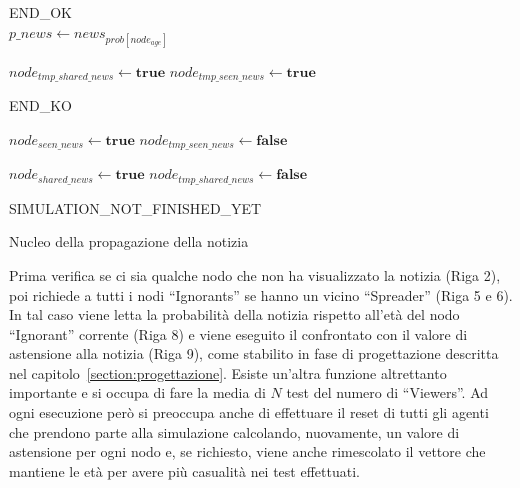 \begin{algorithm}
 \begin{algorithmic}[1]
	\State \Return END\_OK
      \Else 
	  \\
	    \State $p\_news \gets news_{prob[node_{age}]}$
	    
	      \State $node_{tmp\_shared\_news} \gets \textbf{true}$
	    \EndIf
	    \State $node_{tmp\_seen\_news} \gets \textbf{true}$
	    
	  \EndIf
	\EndFor
	  \State \Return END\_KO
	\EndIf
	
	  \State $node_{seen\_news} \gets \textbf{true}$
	  \State $node_{tmp\_seen\_news} \gets \textbf{false}$
	\EndFor
	
	  \State $node_{shared\_news} \gets \textbf{true}$
	  \State $node_{tmp\_shared\_news} \gets \textbf{false}$
	\EndFor
      
	\State \Return SIMULATION\_NOT\_FINISHED\_YET
      \EndIf
    \EndProcedure
 \end{algorithmic}
 
 \caption{Nucleo della propagazione della notizia}
 \label{alg:core_spread}
\end{algorithm}

Prima verifica se ci sia qualche nodo che non ha visualizzato la notizia (Riga 2), 
poi richiede a tutti i nodi ``Ignorants'' se hanno un vicino ``Spreader'' (Riga 5 e 6). 
In tal caso viene letta la probabilità della notizia rispetto all'età del nodo ``Ignorant'' corrente (Riga 8) e viene eseguito il 
confrontato con il valore di astensione alla notizia (Riga 9), come stabilito in fase di progettazione descritta nel capitolo~\ref{section:progettazione}. 
Esiste un'altra funzione altrettanto importante e si occupa di fare la media di $N$ test del numero di ``Viewers''.
Ad ogni esecuzione però si preoccupa anche di effettuare il reset di tutti gli agenti che prendono parte alla simulazione 
calcolando, nuovamente, un valore di astensione per ogni nodo e, se richiesto, viene anche rimescolato il 
vettore che mantiene le età per avere più casualità nei test effettuati.

